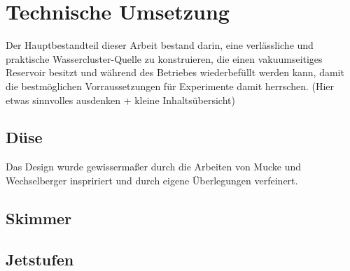 \chapter{Technische Umsetzung} 

Der Hauptbestandteil dieser Arbeit bestand darin, eine verlässliche und praktische Wassercluster-Quelle zu konstruieren, die einen vakuumseitiges Reservoir besitzt und während des Betriebes wiederbefüllt werden kann, damit die bestmöglichen Vorraussetzungen für Experimente damit herrschen. (Hier etwas sinnvolles ausdenken + kleine Inhaltsübersicht)

\section{Düse}

Das Design wurde gewissermaßer durch die Arbeiten von Mucke \cite{mucke2011} und Wechselberger \cite{wechselberger2014} inspririert und durch eigene Überlegungen verfeinert.
%
%



\section{Skimmer}


\section{Jetstufen}


%
%
%
%
%
%
%
%
%
